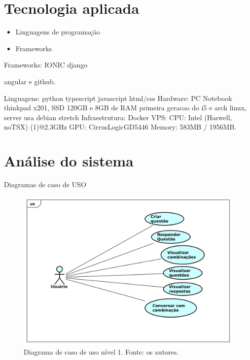 \section{Tecnologia aplicada}

\begin{itemize}
\item Linguagens de programação
\item Frameworks

\end{itemize}

Frameworks: IONIC django

angular e github.

Linguagens: python typescript javascript html/css
Hardware: PC Notebook thinkpad x201, SSD 120GB e 8GB de RAM primeira geracao do i5 e arch linux, server usa debian stretch
Infraestrutura: 	Docker
VPS: CPU: Intel (Haswell, noTSX) (1)@2.3GHz GPU: CirrusLogicGD5446 Memory: 583MB / 1956MB.




\section{Análise do sistema}

Diagramas de caso de USO
\begin{figure}[!htb]
\centering
\includegraphics[width=16cm]{DCU1.png}
\caption{Diagrama de caso de uso nível 1. Fonte: os autores.}
\label{fig:DCU1}
\end{figure}

